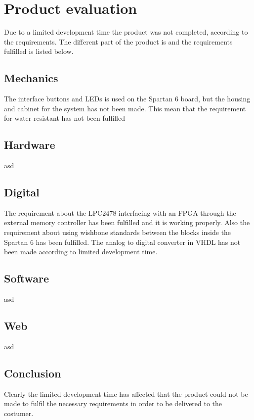 \section{Product evaluation}
Due to a limited development time the product was not completed, according to the requirements. The different part of the product is and the requirements fulfilled is listed below.
\subsection{Mechanics}
The interface buttons and LEDs is used on the Spartan 6 board, but the housing and cabinet for the system has not been made. This mean that the requirement for water resistant has not been fulfilled
\subsection{Hardware}
asd
\subsection{Digital}
The requirement about the LPC2478 interfacing with an FPGA through the external memory controller has been fulfilled and it is working properly. Also the requirement about using wishbone standards between the blocks inside the Spartan 6 has been fulfilled. The analog to digital converter in VHDL has not been made according to limited development time.
\subsection{Software}
asd
\subsection{Web}
asd
\subsection{Conclusion}
Clearly the limited development time has affected that the product could not be made to fulfil the necessary requirements in order to be delivered to the costumer.